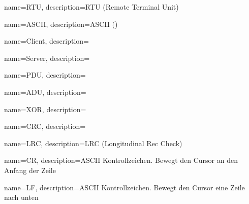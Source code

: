 {
	name=RTU,
	description={RTU (Remote Terminal Unit)}
}

{
	name=ASCII,
	description={ASCII ()}
}

{
	name=Client,
	description={}
}

{
	name=Server,
	description={}
}

{
	name=PDU,
	description={}
}

{
	name=ADU,
	description={}
}

{
	name=XOR,
	description={}
}

{
	name=CRC,
	description={}
}

{
	name=LRC,
	description={LRC (Longitudinal Rec Check)}
}

{
	name=CR,
	description={ASCII Kontrollzeichen. Bewegt den Cursor an den Anfang der Zeile}
}

{
	name=LF,
	description={ASCII Kontrollzeichen. Bewegt den Cursor eine Zeile nach unten}
}